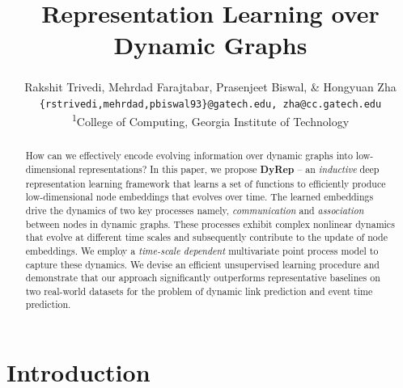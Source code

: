 \documentclass[11pt]{article}
\title{Representation Learning over Dynamic Graphs}
\author{Rakshit Trivedi\textsuperscript{\normalfont 1}, Mehrdad Farajtabar\textsuperscript{\normalfont 1}, Prasenjeet Biswal\textsuperscript{\normalfont 1}, \& Hongyuan Zha\textsuperscript{\normalfont 1} \\
\texttt{\{rstrivedi,mehrdad,pbiswal93\}@gatech.edu, zha@cc.gatech.edu}\\
\textsuperscript{1}College of Computing, Georgia Institute of Technology\\
}
\date{}
\begin{document}
\maketitle
\begin{abstract}
How can we effectively encode evolving information over dynamic graphs into low-dimensional representations? In this paper, we propose \textbf{DyRep} -- an \textit{inductive} deep representation learning framework that learns a set of functions to efficiently produce low-dimensional node embeddings that evolves over time. The learned embeddings drive the dynamics of two key processes namely, \textit{communication} and  \textit{association} between nodes in dynamic graphs. These processes exhibit complex nonlinear dynamics that evolve at different time scales and subsequently contribute to the update of node embeddings. We employ a \textit{time-scale dependent} multivariate point process model to capture these dynamics. We devise an efficient unsupervised learning procedure and demonstrate that our approach significantly outperforms representative baselines on two real-world datasets for the problem of dynamic link prediction and event time prediction.

%
%
%
%
\end{abstract}

\section{Introduction}
\label{intro}
\end{document}
